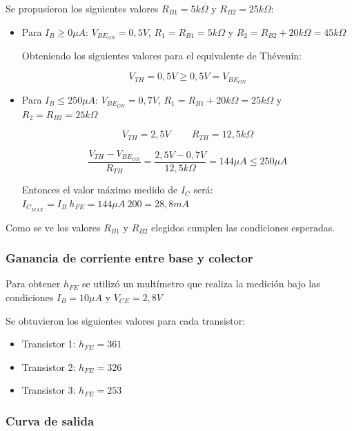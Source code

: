\documentclass[10pt,spanish,a4paper,openany,notitlepage]{article}
\begin{document}
Se propusieron los siguientes valores $R_{B1} = 5\unit{k\Omega}$ y $R_{B2} = 25\unit{k\Omega}$:

\begin{itemize}
\item{Para $I_B \geq 0 \unit{\mu A}$}: $V_{BE_{ON}} = 0,5 \unit{V}$, $R_1 = R_{B1} = 5 \unit{k\Omega}$ y $R_2 = R_{B2} + 20\unit{k\Omega} = 45 \unit{k\Omega}$

Obteniendo los siguientes valores para el equivalente de Thévenin:

\[ \displaystyle V_{TH} =  0,5 \unit{V} \geq 0,5 \unit{V} = V_{BE_{ON}}\]

\item{Para $I_B \leq 250 \unit{\mu A}$}: $V_{BE_{ON}} = 0,7 \unit{V}$, $R_1 = R_{B1}+ 20\unit{k\Omega} = 25 \unit{k\Omega}$ y $R_2 = R_{B2} = 25 \unit{k\Omega}$

\[ \displaystyle V_{TH} =  2,5 \unit{V} \ \ \ \ \ \ \ \ \ \  R_{TH} = 12,5 \unit{k\Omega}\]

\[ \displaystyle \frac{V_{TH} - V_{BE_{ON}}}{R_{TH}} = \frac{2,5 \unit{V} - 0,7 \unit{V}}{12,5 \unit{k\Omega}} = 144 \unit{\mu A} \leq 250 \unit{\mu A} \]

Entonces el valor máximo medido de $I_C$ será: $I_{C_{MAX}} = I_B\ h_{FE} = 144 \unit{\mu A}\ 200 = 28,8 \unit{mA}$

\end{itemize}

Como se ve los valores $R_{B1}$ y $R_{B2}$ elegidos cumplen las condiciones esperadas.

\subsubsection{Ganancia de corriente entre base y colector}

Para obtener $h_{FE}$ se utilizó un multímetro que realiza la medición 
bajo las condiciones $I_B = 10 \unit{\mu A}$ y $V_{CE} = 2,8 \unit{V}$

Se obtuvieron los siguientes valores para cada transistor:

\begin{itemize}
\item{Transistor 1:} $h_{FE} = 361$
\item{Transistor 2:} $h_{FE} = 326$
\item{Transistor 3:} $h_{FE} = 253$
\end{itemize}

\subsubsection{Curva de salida}
\end{document}
